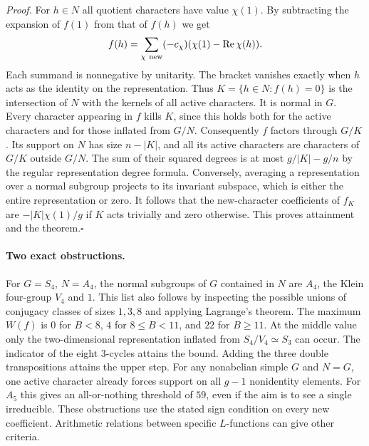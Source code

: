 \medskip\noindent\emph{Proof.}
For $h\in N$ all quotient characters have value $\chi(1)$. By subtracting the expansion of $f(1)$ from that of $f(h)$ we get
\[
 f(h)=\sum_{\chi\ {\rm new}}(-c_\chi)(\chi(1)-\operatorname{Re}\chi(h)).
\]
Each summand is nonnegative by unitarity. The bracket vanishes exactly when $h$ acts as the identity on the representation. Thus
$K=\{h\in N:f(h)=0\}$ is the intersection of $N$ with the kernels of all active characters. It is normal in $G$. Every character appearing in $f$ kills $K$, since this holds both for the active characters and for those inflated from $G/N$. Consequently $f$ factors through $G/K$. Its support on $N$ has size $n-|K|$, and all its active characters are characters of $G/K$ outside $G/N$. The sum of their squared degrees is at most $g/|K|-g/n$ by the regular representation degree formula. Conversely, averaging a representation over a normal subgroup projects to its invariant subspace, which is either the entire representation or zero. It follows that the new-character coefficients of $f_K$ are $-|K|\chi(1)/g$ if $K$ acts trivially and zero otherwise. This proves attainment and the theorem.\hfill$\square$

\paragraph{Two exact obstructions.} For $G=S_4$, $N=A_4$, the normal subgroups of $G$ contained in $N$ are $A_4$, the Klein four-group $V_4$ and $1$. This list also follows by inspecting the possible unions of conjugacy classes of sizes $1,3,8$ and applying Lagrange's theorem. The maximum $W(f)$ is $0$ for $B<8$, $4$ for $8\le B<11$, and $22$ for $B\ge11$. At the middle value only the two-dimensional representation inflated from $S_4/V_4\simeq S_3$ can occur. The indicator of the eight $3$-cycles attains the bound. Adding the three double transpositions attains the upper step. For any nonabelian simple $G$ and $N=G$, one active character already forces support on all $g-1$ nonidentity elements. For $A_5$ this gives an all-or-nothing threshold of $59$, even if the aim is to see a single irreducible. These obstructions use the stated sign condition on every new coefficient. Arithmetic relations between specific $L$-functions can give other criteria.

